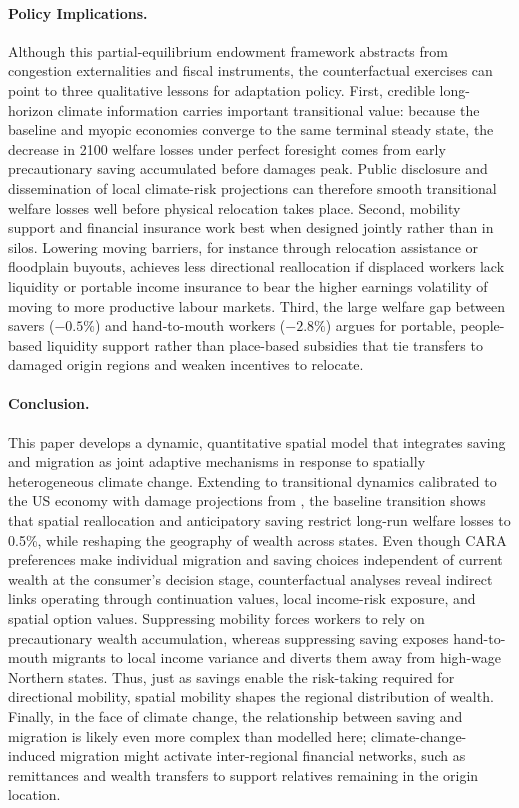 \documentclass[11pt, a4paper]{article}
\begin{document}
\paragraph{Policy Implications.} Although this partial-equilibrium endowment framework abstracts from congestion externalities and fiscal instruments, the counterfactual exercises can point to three qualitative lessons for adaptation policy. First, credible long-horizon climate information carries important transitional value: because the baseline and myopic economies converge to the same terminal steady state, the decrease in 2100 welfare losses under perfect foresight comes from early precautionary saving accumulated before damages peak. Public disclosure and dissemination of local climate-risk projections can therefore smooth transitional welfare losses well before physical relocation takes place. Second, mobility support and financial insurance work best when designed jointly rather than in silos. Lowering moving barriers, for instance through relocation assistance or floodplain buyouts, achieves less directional reallocation if displaced workers lack liquidity or portable income insurance to bear the higher earnings volatility of moving to more productive labour markets. Third, the large welfare gap between savers ($-0.5\%$) and hand-to-mouth workers ($-2.8\%$) argues for portable, people-based liquidity support rather than place-based subsidies that tie transfers to damaged origin regions and weaken incentives to relocate.

\paragraph{Conclusion.} This paper develops a dynamic, quantitative spatial model that integrates saving and migration as joint adaptive mechanisms in response to spatially heterogeneous climate change. Extending \citet{dvorkin_geography_2025} to transitional dynamics calibrated to the US economy with damage projections from \citet{hsiang_estimating_2017}, the baseline transition shows that spatial reallocation and anticipatory saving restrict long-run welfare losses to 0.5\%, while reshaping the geography of wealth across states. Even though CARA preferences make individual migration and saving choices independent of current wealth at the consumer's decision stage, counterfactual analyses reveal indirect links operating through continuation values, local income-risk exposure, and spatial option values. Suppressing mobility forces workers to rely on precautionary wealth accumulation, whereas suppressing saving exposes hand-to-mouth migrants to local income variance and diverts them away from high-wage Northern states. Thus, just as savings enable the risk-taking required for directional mobility, spatial mobility shapes the regional distribution of wealth. Finally, in the face of climate change, the relationship between saving and migration is likely even more complex than modelled here; climate-change-induced migration might activate inter-regional financial networks, such as remittances and wealth transfers to support relatives remaining in the origin location.
\end{document}
